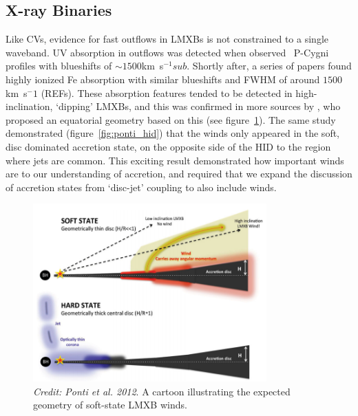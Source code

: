\subsection{X-ray Binaries}
\label{sec:xrb_winds}

Like CVs, evidence for fast outflows in LMXBs is not constrained to 
a single waveband. UV absorption in outflows was detected when
\cite{ioannau2003} observed \civfull\ P-Cygni profiles with blueshifts 
of $\sim1500$km~s$^{-1}sub $. Shortly after, a series of papers found 
highly ionized Fe absorption with similar blueshifts and FWHM of around 
$1500$km~s$^-1$ (REFs). These absorption features tended to be detected
in high-inclination, `dipping' LMXBs, and this was confirmed in more sources
by \cite{ponti2012}, who proposed an equatorial geometry based on this (see 
figure~\ref{fig:ponti_cartoon}). 
The same study demonstrated (figure~\ref{fig:ponti_hid}) that
the winds only appeared in the soft, 
disc dominated accretion state, on the opposite side of the HID to the
region where jets are common. This exciting result demonstrated how
important winds are to our understanding of accretion, and required that
we expand the discussion of accretion states from `disc-jet' coupling
to also include winds.

\begin{figure}
\centering
\includegraphics[width=0.8\textwidth]{figures/01-intro/ponti_wind_cartoon.png}
\caption
{
{\sl Credit: Ponti et al. 2012}. 
A cartoon illustrating the expected geometry of soft-state LMXB winds.
} 
\label{fig:ponti_cartoon}
\end{figure}


